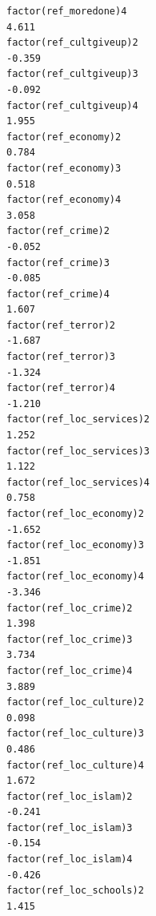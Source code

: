 \documentclass[
]{article}
\begin{document}
\begin{table}
\begin{minipage}[t]{\linewidth}
{\begin{verbatim}
factor(ref_moredone)4                                                               4.611
factor(ref_cultgiveup)2                                                            -0.359
factor(ref_cultgiveup)3                                                            -0.092
factor(ref_cultgiveup)4                                                             1.955
factor(ref_economy)2                                                                0.784
factor(ref_economy)3                                                                0.518
factor(ref_economy)4                                                                3.058
factor(ref_crime)2                                                                 -0.052
factor(ref_crime)3                                                                 -0.085
factor(ref_crime)4                                                                  1.607
factor(ref_terror)2                                                                -1.687
factor(ref_terror)3                                                                -1.324
factor(ref_terror)4                                                                -1.210
factor(ref_loc_services)2                                                           1.252
factor(ref_loc_services)3                                                           1.122
factor(ref_loc_services)4                                                           0.758
factor(ref_loc_economy)2                                                           -1.652
factor(ref_loc_economy)3                                                           -1.851
factor(ref_loc_economy)4                                                           -3.346
factor(ref_loc_crime)2                                                              1.398
factor(ref_loc_crime)3                                                              3.734
factor(ref_loc_crime)4                                                              3.889
factor(ref_loc_culture)2                                                            0.098
factor(ref_loc_culture)3                                                            0.486
factor(ref_loc_culture)4                                                            1.672
factor(ref_loc_islam)2                                                             -0.241
factor(ref_loc_islam)3                                                             -0.154
factor(ref_loc_islam)4                                                             -0.426
factor(ref_loc_schools)2                                                            1.415

\end{verbatim}}
\end{minipage}
\end{table}
\end{document}
